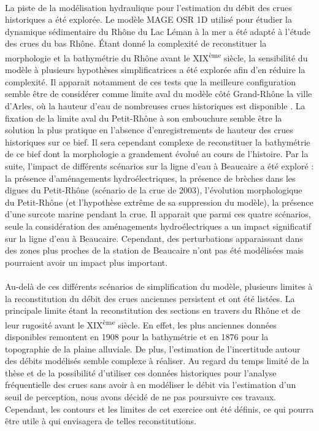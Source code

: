 	\paragraph{} La piste de la modélisation hydraulique pour l'estimation du débit des crues historiques a été explorée. Le modèle MAGE OSR 1D utilisé pour étudier la dynamique sédimentaire du Rhône du Lac Léman à la mer a été adapté à l'étude des crues du bas Rhône. Étant donné la complexité de reconstituer la morphologie et la bathymétrie du Rhône avant le XIX\textsuperscript{ème} siècle, la sensibilité du modèle à plusieurs hypothèses simplificatrices a été explorée afin d'en réduire la complexité. Il apparait notamment de ces tests que la meilleure configuration semble être de considérer comme limite aval du modèle côté Grand-Rhône la ville d'Arles, où la hauteur d'eau de nombreuses crues historiques est disponible \citep{pichard_hauteurs_2013}. La fixation de la limite aval du Petit-Rhône à son embouchure semble être la solution la plus pratique en l'absence d'enregistrements de hauteur des crues historiques sur ce bief. Il sera cependant complexe de reconstituer la bathymétrie de ce bief dont la morphologie a grandement évolué au cours de l'histoire. Par la suite, l'impact de différents scénarios sur la ligne d'eau à Beaucaire a été exploré : la présence d'aménagements hydroélectriques, la présence de brèches dans les digues du Petit-Rhône (scénario de la crue de 2003), l'évolution morphologique du Petit-Rhône (et l'hypothèse extrême de sa suppression du modèle), la présence d'une surcote marine pendant la crue. Il apparait que parmi ces quatre scénarios, seule la considération des aménagements hydroélectriques a un impact significatif sur la ligne d'eau à Beaucaire. Cependant, des perturbations apparaissant dans des zones plus proches de la station de Beaucaire n'ont pas été modélisées mais pourraient avoir un impact plus important.
	
	\paragraph{}	 Au-delà de ces différents scénarios de simplification du modèle, plusieurs limites à la reconstitution du débit des crues anciennes persistent et ont été listées. La principale limite étant la reconstitution des sections en travers du Rhône et de leur rugosité avant le XIX\textsuperscript{ème} siècle. En effet, les plus anciennes données disponibles remontent en 1908 pour la bathymétrie et en 1876 pour la topographie de la plaine alluviale. De plus, l'estimation de l'incertitude autour des débits modélisés semble complexe à réaliser. Au regard du temps limité de la thèse et de la possibilité d'utiliser ces données historiques pour l'analyse fréquentielle des crues sans avoir à en modéliser le débit via l'estimation d'un seuil de perception, nous avons décidé de ne pas poursuivre ces travaux. Cependant, les contours et les limites de cet exercice ont été définis, ce qui pourra être utile à qui envisagera de telles reconstitutions. 
	